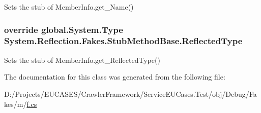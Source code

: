 Sets the stub of Member\-Info.\-get\-\_\-\-Name()

\hypertarget{class_system_1_1_reflection_1_1_fakes_1_1_stub_method_base_a96233a47a96a8b0289d078e15e6fb832}{
\subsubsection[{Reflected\-Type}]{\setlength{\rightskip}{0pt plus 5cm}override global.\-System.\-Type System.\-Reflection.\-Fakes.\-Stub\-Method\-Base.\-Reflected\-Type\hspace{0.3cm}{\ttfamily [get]}}}\label{class_system_1_1_reflection_1_1_fakes_1_1_stub_method_base_a96233a47a96a8b0289d078e15e6fb832}


Sets the stub of Member\-Info.\-get\-\_\-\-Reflected\-Type()



The documentation for this class was generated from the following file\-:\begin{DoxyCompactItemize}
\item 
D\-:/\-Projects/\-E\-U\-C\-A\-S\-E\-S/\-Crawler\-Framework/\-Service\-E\-U\-Cases.\-Test/obj/\-Debug/\-Fakes/m/\hyperlink{m_2f_8cs}{f.\-cs}\end{DoxyCompactItemize}
